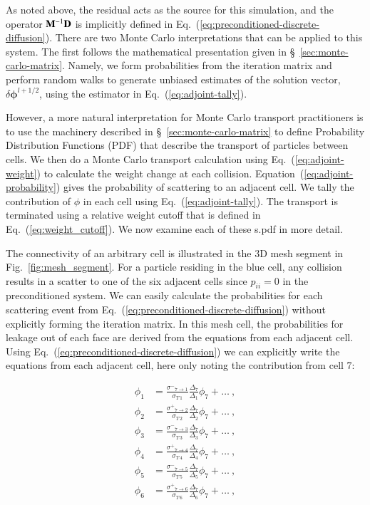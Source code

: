 \documentclass[preprint,12pt]{elsarticle}
\newcommand{\sigm}{\ensuremath{\sigma^{-}}}
\newcommand{\sigp}{\ensuremath{\sigma^{+}}}
\newcommand{\bphi}{\ensuremath{\boldsymbol{\phi}}}
\begin{document}
As noted above, the residual acts as the source for this simulation,
and the operator $\mathbf{M}^{-1}\mathbf{D}$ is implicitly defined in
Eq.~(\ref{eq:preconditioned-discrete-diffusion}).  There are two Monte
Carlo interpretations that can be applied to this system.  The first
follows the mathematical presentation given in
\S~\ref{sec:monte-carlo-matrix}.  Namely, we form probabilities from
the iteration matrix and perform random walks to generate unbiased
estimates of the solution vector, $\delta\bphi^{l+1/2}$, using the
estimator in Eq.~(\ref{eq:adjoint-tally}).

However, a more natural interpretation for Monte Carlo transport
practitioners is to use the machinery described in
\S~\ref{sec:monte-carlo-matrix} to define Probability Distribution
Functions (PDF) that describe the transport of particles between
cells.  We then do a Monte Carlo transport calculation using
Eq.~(\ref{eq:adjoint-weight}) to calculate the weight change at each
collision. Equation~(\ref{eq:adjoint-probability}) gives the
probability of scattering to an adjacent cell. We tally the
contribution of $\phi$ in each cell using
Eq.~(\ref{eq:adjoint-tally}).  The transport is terminated using a
relative weight cutoff that is defined in
Eq.~(\ref{eq:weight_cutoff}).  We now examine each of these s.pdf in
more detail.

The connectivity of an arbitrary cell is illustrated in the 3D mesh
segment in Fig.~\ref{fig:mesh_segment}.  For a particle residing in
the blue cell, any collision results in a scatter to one of the six
adjacent cells since $p_{ii}=0$ in the preconditioned system.  We can
easily calculate the probabilities for each scattering event from
Eq.~(\ref{eq:preconditioned-discrete-diffusion}) without explicitly
forming the iteration matrix.  In this mesh cell, the probabilities
for leakage out of each face are derived from the equations from each
adjacent cell.  Using Eq.~(\ref{eq:preconditioned-discrete-diffusion})
we can explicitly write the equations from each adjacent cell, here
only noting the contribution from cell 7:

\begin{align*}
  \phi_1 &= \frac{\sigm_{7\rightarrow
      1}}{\sigma_{T\,1}}\frac{\Delta_7}{\Delta_1}\phi_7 + \ldots\:,\\
  \phi_2 &= \frac{\sigp_{7\rightarrow
      2}}{\sigma_{T\,2}}\frac{\Delta_7}{\Delta_2}\phi_7 + \ldots\:,\\
  \phi_3 &= \frac{\sigm_{7\rightarrow
      3}}{\sigma_{T\,3}}\frac{\Delta_7}{\Delta_3}\phi_7 + \ldots\:,\\
  \phi_4 &= \frac{\sigp_{7\rightarrow
      4}}{\sigma_{T\,4}}\frac{\Delta_7}{\Delta_4}\phi_7 + \ldots\:,\\
  \phi_5 &= \frac{\sigm_{7\rightarrow
      5}}{\sigma_{T\,5}}\frac{\Delta_7}{\Delta_5}\phi_7 + \ldots\:,\\
  \phi_6 &= \frac{\sigp_{7\rightarrow
      6}}{\sigma_{T\,6}}\frac{\Delta_7}{\Delta_6}\phi_7 + \ldots\:,\\
\end{align*} 
\end{document}
